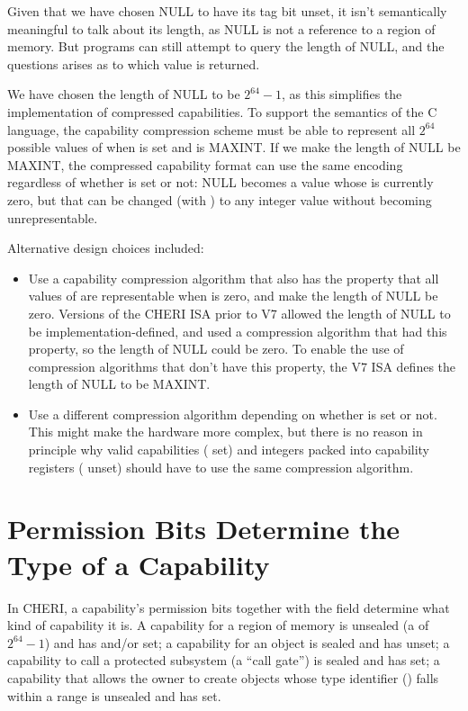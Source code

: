 Given that we have chosen NULL to have its tag bit unset, it isn't semantically
meaningful to talk about its length, as NULL is not a reference to a region
of memory. But programs can still attempt to query the length of NULL, and
the questions arises as to which value is returned.

We have chosen the length of NULL to be $2^{64}-1$, as this simplifies the
implementation of compressed capabilities. To support the semantics of the
C language, the capability compression scheme must be able to represent
all $2^{64}$ possible values of \coffset{} when \ctag{} is set and \clength{}
is MAXINT. If we make the length of NULL be MAXINT, the compressed capability
format can use the same encoding regardless of whether \ctag{} is set or
not:  NULL becomes a value whose \coffset{} is currently zero, but that can
be changed (with ) to any integer value without
becoming unrepresentable.

Alternative design choices included:

\begin{itemize}
\item
Use a capability compression algorithm that also has the property that all
values of \coffset{} are representable when \clength{} is zero, and make
the length of NULL be zero. Versions of the CHERI ISA prior to V7 allowed the
length of NULL to be implementation-defined, and used a compression algorithm
that had this property, so the length of NULL could be zero. To enable the
use of compression algorithms that don't have this property, the V7 ISA
defines the length of NULL to be MAXINT.
\item
Use a different compression algorithm depending on whether \ctag{} is set
or not. This might make the hardware more complex, but there is no reason in
principle why valid capabilities (\ctag{} set) and integers packed into
capability registers (\ctag{} unset) should have to use the same compression
algorithm.
\end{itemize}

\section{Permission Bits Determine the Type of a Capability}

In CHERI, a capability's permission bits together with the \cotype{} field
determine what kind of capability it is. A capability for a region of memory
is unsealed (a \cotype{} of $2^{64}-1$) and has \emph{\cappermL{}} and/or \emph{\cappermS{}} set;
a capability for an object is sealed and has \emph{\cappermX{}}
unset; a capability to call a protected subsystem (a ``call gate'') is
sealed and has \emph{\cappermX{}} set; a capability that allows
the owner to create objects whose type identifier (\cotype{}) falls within
a range is unsealed and has \emph{\cappermSeal{}} set.

